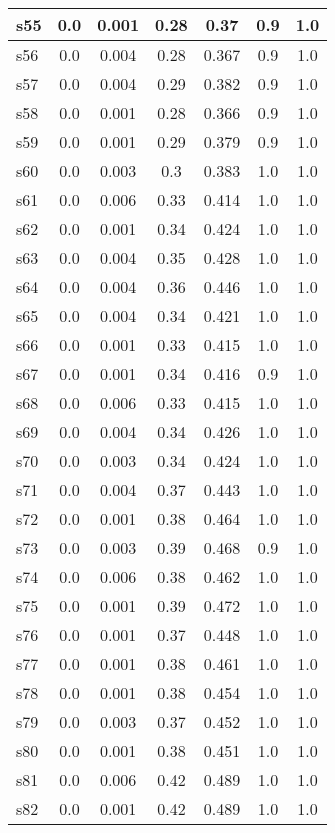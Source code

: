 \documentclass{article}
\begin{document}
\begin{tabular}{|l|c|c|c|c|c|c|}
\hline
s55 &0.0 & 0.001 & 0.28 & 0.37 & 0.9 & 1.0\\
\hline
s56 &0.0 & 0.004 & 0.28 & 0.367 & 0.9 & 1.0\\
\hline
s57 &0.0 & 0.004 & 0.29 & 0.382 & 0.9 & 1.0\\
\hline
s58 &0.0 & 0.001 & 0.28 & 0.366 & 0.9 & 1.0\\
\hline
s59 &0.0 & 0.001 & 0.29 & 0.379 & 0.9 & 1.0\\
\hline
s60 &0.0 & 0.003 & 0.3 & 0.383 & 1.0 & 1.0\\
\hline
s61 &0.0 & 0.006 & 0.33 & 0.414 & 1.0 & 1.0\\
\hline
s62 &0.0 & 0.001 & 0.34 & 0.424 & 1.0 & 1.0\\
\hline
s63 &0.0 & 0.004 & 0.35 & 0.428 & 1.0 & 1.0\\
\hline
s64 &0.0 & 0.004 & 0.36 & 0.446 & 1.0 & 1.0\\
\hline
s65 &0.0 & 0.004 & 0.34 & 0.421 & 1.0 & 1.0\\
\hline
s66 &0.0 & 0.001 & 0.33 & 0.415 & 1.0 & 1.0\\
\hline
s67 &0.0 & 0.001 & 0.34 & 0.416 & 0.9 & 1.0\\
\hline
s68 &0.0 & 0.006 & 0.33 & 0.415 & 1.0 & 1.0\\
\hline
s69 &0.0 & 0.004 & 0.34 & 0.426 & 1.0 & 1.0\\
\hline
s70 &0.0 & 0.003 & 0.34 & 0.424 & 1.0 & 1.0\\
\hline
s71 &0.0 & 0.004 & 0.37 & 0.443 & 1.0 & 1.0\\
\hline
s72 &0.0 & 0.001 & 0.38 & 0.464 & 1.0 & 1.0\\
\hline
s73 &0.0 & 0.003 & 0.39 & 0.468 & 0.9 & 1.0\\
\hline
s74 &0.0 & 0.006 & 0.38 & 0.462 & 1.0 & 1.0\\
\hline
s75 &0.0 & 0.001 & 0.39 & 0.472 & 1.0 & 1.0\\
\hline
s76 &0.0 & 0.001 & 0.37 & 0.448 & 1.0 & 1.0\\
\hline
s77 &0.0 & 0.001 & 0.38 & 0.461 & 1.0 & 1.0\\
\hline
s78 &0.0 & 0.001 & 0.38 & 0.454 & 1.0 & 1.0\\
\hline
s79 &0.0 & 0.003 & 0.37 & 0.452 & 1.0 & 1.0\\
\hline
s80 &0.0 & 0.001 & 0.38 & 0.451 & 1.0 & 1.0\\
\hline
s81 &0.0 & 0.006 & 0.42 & 0.489 & 1.0 & 1.0\\
\hline
s82 &0.0 & 0.001 & 0.42 & 0.489 & 1.0 & 1.0\\

\end{tabular}
\end{document}
